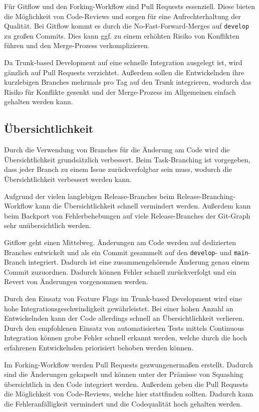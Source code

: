 Für Gitflow und den Forking\hyp Workflow sind Pull Requests essenziell. Diese bieten die Möglichkeit von Code\hyp Reviews und sorgen für eine Aufrechterhaltung der Qualität. Bei Gitflow kommt es durch die No\hyp Fast\hyp Forward\hyp Merges auf \texttt{develop} zu großen Commits. Dies kann ggf. zu einem erhöhten Risiko von Konflikten führen und den Merge\hyp Prozess verkomplizieren.

Da Trunk\hyp based Development auf eine schnelle Integration ausgelegt ist, wird gänzlich auf Pull Requests verzichtet. Außerdem sollen die Entwickelnden ihre kurzlebigen Branches mehrmals pro Tag auf den Trunk integrieren, wodurch das Risiko für Konflikte gesenkt und der Merge\hyp Prozess im Allgemeinen einfach gehalten werden kann.


\subsection{Übersichtlichkeit}

Durch die Verwendung von Branches für die Änderung am Code wird die Übersichtlichkeit grundsätzlich verbessert. Beim Task\hyp Branching ist vorgegeben, dass jeder Branch zu einem Issue zurückverfolgbar sein muss, wodurch die Übersichtlichkeit verbessert werden kann.

Aufgrund der vielen langlebigen Release\hyp Branches beim Release\hyp Branching\hyp Workflow kann die Übersichtlichkeit schnell vermindert werden. Außerdem kann beim Backport von Fehlerbehebungen auf viele Release\hyp Branches der Git\hyp Graph sehr unübersichtlich werden.

Gitflow geht einen Mittelweg. Änderungen am Code werden auf dedizierten Branches entwickelt und als ein Commit gesammelt auf den \texttt{develop}- und \texttt{main}\hyp Branch integriert. Dadurch ist eine zusammengehörende Änderung genau einem Commit zuzuordnen. Dadurch können Fehler schnell zurückverfolgt und ein Revert von Änderungen vorgenommen werden.

Durch den Einsatz von Feature Flags im Trunk\hyp based Development wird eine hohe Integrationsgeschwindigkeit gewährleistet. Bei einer hohen Anzahl an Entwickelnden kann der Code allerdings schnell an Übersichtlichkeit verlieren. Durch den empfohlenen Einsatz von automatisierten Tests mittels Continuous Integration können grobe Fehler schnell erkannt werden, welche durch die hoch erfahrenen Entwickelnden priorisiert behoben werden können.

Im Forking\hyp Workflow werden Pull Requests gezwungenermaßen erstellt. Dadurch sind die Änderungen gekapselt und können unter der Prämisse von Squashing übersichtlich in den Code integriert werden. Außerdem geben die Pull Requests die Möglichkeit von Code\hyp Reviews, welche hier stattfinden sollten. Dadurch kann die Fehleranfälligkeit vermindert und die Codequalität hoch gehalten werden.


